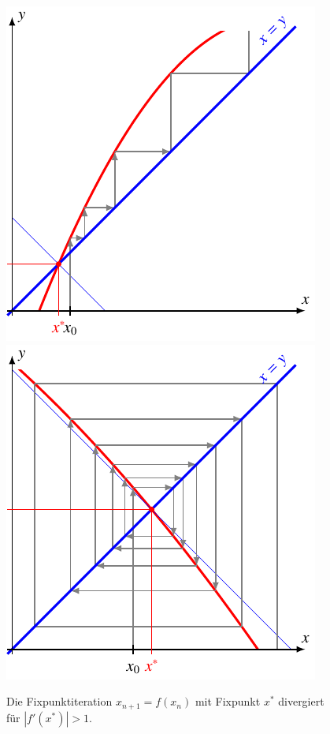 \begin{figure}
\centering
\includegraphics{chapters/10-arithmetik/figures/divergent.pdf}
\includegraphics{chapters/10-arithmetik/figures/negdiv.pdf}
\caption{Die Fixpunktiteration $x_{n+1}=f(x_n)$ mit Fixpunkt $x^*$
divergiert für $|f'(x^*)|>1$.
\label{buch:figure:fixpunkt:divergent}}
\end{figure}
%
